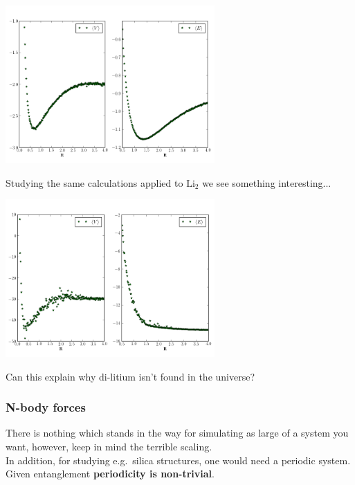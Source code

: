 \documentclass[
paper=128mm:96mm, %
fontsize=11pt, %
pagesize, %
parskip=half-, %
]{scrartcl} %
\theoremstyle{mythmstyle} %
\begin{document}
\begin{center}
 \includegraphics[width=0.6\textwidth]{R_vs_E_hyd_pure}
\end{center}


\clearpage

Studying the same calculations applied to $\mathrm{Li}_2$ we see something interesting...

\begin{center}
 \includegraphics[width=0.6\textwidth]{R_vs_E_lit_pure}
\end{center}

\clearpage

Can this explain why di-litium isn't found in the universe?
\clearpage

\subsubsection*{N-body forces}

There is nothing which stands in the way for simulating as large of a system you want, however, keep in mind the terrible scaling.\\

In addition, for studying e.g.~silica structures, one would need a periodic system. Given entanglement \textbf{periodicity is non-trivial}. \\
\end{document}
